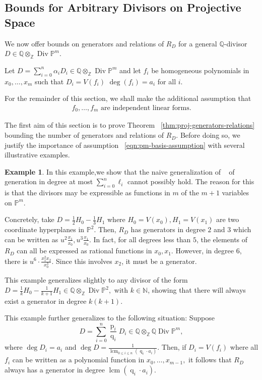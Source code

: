 \documentclass{amsart}
\theoremstyle{plain}
\theoremstyle{definition}
\newtheorem{example}[thm]{Example}
\theoremstyle{remark}
\numberwithin{equation}{section}
\newcommand\ssec{\subsection}
\newcommand\bn{{\mathbb N}}
\newcommand\bq{{\mathbb Q}}
\newcommand\bp{{\mathbb P}}
\newcommand\bz{{\mathbb Z}}
\DeclareMathOperator\di{Div}
\newcommand\bida{a}
\DeclareMathOperator{\num}{p}
\DeclareMathOperator{\den}{q}
\DeclareMathOperator{\lcm}{lcm}
\begin{document}
\ssec{Bounds for Arbitrary Divisors on Projective Space}


We now offer bounds on generators and relations of $R_D$ for a general $\bq$-divisor $D \in \bq \otimes_\bz \di \bp^m$.

Let $D = \sum_{i=0}^n \alpha_i D_i \in \bq \otimes_\bz \di \bp^m$ and let $f_i$ be
homogeneous polynomials in $x_0, \ldots, x_m$ such that $D_i = V(f_i)$
$\deg(f_i) = a_i$ for all $i$. 

For the remainder of this section, we shall make the additional assumption that 
\begin{align} \label{eqn:pm-basis-assumption} f_0, \ldots, f_{m}
	\text{ are independent linear forms.} \end{align}

The first aim of this section is to prove Theorem
~\ref{thm:proj-generators-relations} bounding the number of generators and
relations of $R_D$. Before doing so, we justify the importance of assumption
~\eqref{eqn:pm-basis-assumption} with several illustrative examples.

\begin{example}
\label{eg:hyperplane}
In this example,we show that the naive generalization of
~\cite[Theorem 8]{dorney:canonical} of generation in degree at most
$\sum_{i=0}^{n}\ell_i$ cannot possibly hold. The reason for this is
that the divisors may be
expressible as functions in $m$ of the $m+1$ variables on $\bp^m$.

Concretely, take $D = \frac{1}{2}H_0 - \frac{1}{3}H_1$ where $H_0 = V(x_0),
H_1 = V(x_1)$ are two coordinate hyperplanes in $\bp^2$. Then, $R_D$
has generators in degree $2$ and $3$ which can be written as $u^2
\frac{x_1}{x_0}, u^3 \frac{x_1}{x_0}.$ In fact, for all degrees
less than $5$, the elements of $R_D$ can all be expressed as
rational functions in $x_0, x_1$. However, in degree $6$, there is
$u^6 \cdot \frac{x_1^2 x_2}{x_0^3}$. Since this
involves $x_2$, it must be a generator.

This example generalizes slightly to any divisor of the form $D =
\frac{1}{k}H_0 - \frac{1}{k+1}H_1 \in \bq \otimes_\bz \di \bp^2,$ with
$k \in \bn$, showing that there will always exist a generator in
degree $k(k + 1)$.

This example further generalizes to the following situation:
Suppose 
\[
	D = \sum_{i=0}^{n} \frac{\num_i}{\den_i}D_i \in \bq
	\otimes_\bz \bq \di \bp^m,
\]
where $\deg D_i = \bida_i$ and $\deg D = \frac{1}{\lcm
_{0 \leq i \leq n}(\den_i \cdot \bida_i)}$. Then, if $D_i = V(f_i)$
where all $f_i$ can be written as a polynomial function in $x_0,
\ldots, x_{m-1},$ it follows that $R_D$ always has a generator in degree
$\lcm(\den_i \cdot \bida_i)$.
\end{example}
\end{document}
